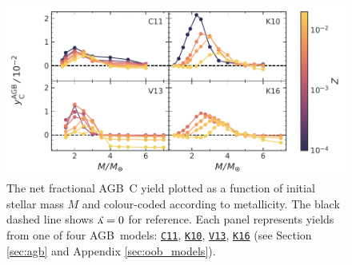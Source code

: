 \documentclass[fleqn,usenatbib]{mnras}
\newcommand{\cxi}{\texttt{\hyperlink{C11}{C11}}}
\newcommand{\kx}{\texttt{\hyperlink{K10}{K10}}}
\newcommand{\kxvi}{\texttt{\hyperlink{K16}{K16}}}
\newcommand{\vxiii}{\texttt{\hyperlink{V13}{V13}}}
\newcommand{\agb}{AGB}
\newcommand{\y}{\ensuremath{\rotatebox[origin=B,y=0.5ex]{180}{y}}}
\begin{document}
\begin{figure}
    \centering
 	    \includegraphics[scale=1]{agb_yields.pdf}
        \caption[]{The net fractional \agb\ C yield  plotted as a function of initial stellar mass $M$ and colour-coded according to metallicity. The black dashed line shows $\y=0$ for reference. Each panel represents yields from one of four \agb\ models: \cxi, \kx{}, \vxiii{}, \kxvi{} (see Section \ref{sec:agb} and  Appendix \ref{sec:oob_models}). }
        \label{fig:y_agb}
\end{figure}
\end{document}
